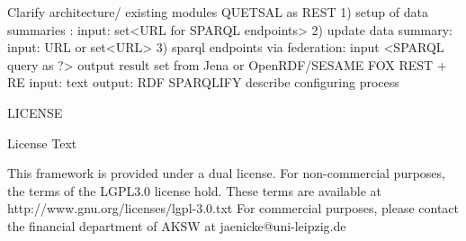 \documentclass{scrartcl}
\begin{document}
Clarify architecture/ existing modules
QUETSAL as REST
1) setup of data summaries : 
input: set<URL for SPARQL endpoints>
2) update data summary:
 input: URL or set<URL>
3) sparql endpoints via federation: 
input <SPARQL query as ?>
output result set from Jena or OpenRDF/SESAME
FOX REST + RE
input: text
output: RDF
SPARQLIFY
describe configuring process

LICENSE

License Text

This framework is provided under a dual license. For non-commercial purposes, the terms of the LGPL3.0 license hold. These terms are available at http://www.gnu.org/licenses/lgpl-3.0.txt 
For commercial purposes, please contact the financial department of AKSW at jaenicke@uni-leipzig.de
\end{document}
